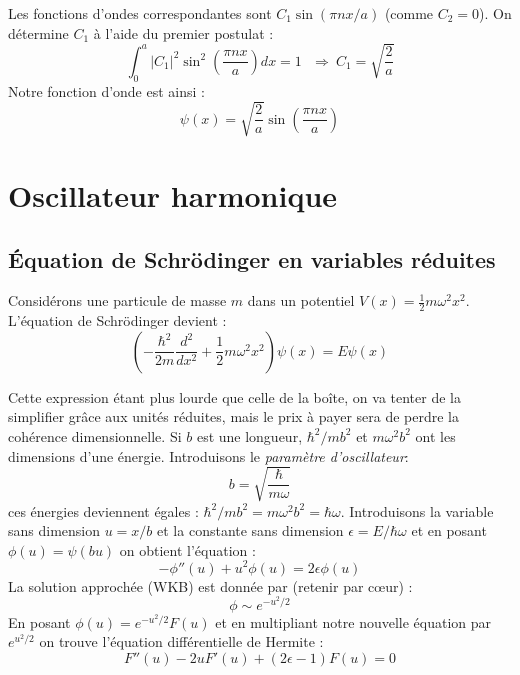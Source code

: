 \documentclass	[11pt, a4paper, openany]{book}
\begin{document}
	Les fonctions d'ondes correspondantes sont $C_1\sin(\pi n x/a)$ (comme $C_2 = 0$). On détermine $C_1$ à l'aide du premier postulat :
	\begin{equation}
		\int_0^a |C_1|^2\sin^2\left(\frac{\pi n x}{a}\right)dx = 1\ \ \ \Rightarrow\ C_1 = \sqrt{\frac{2}{a}}
	\end{equation}
	Notre fonction d'onde est ainsi :
	\begin{equation}
		\psi(x) = \sqrt{\frac{2}{a}}\sin\left(\frac{\pi n x}{a}\right)
	\end{equation}
	
	
	\section{Oscillateur harmonique}
	\subsection{Équation de Schrödinger en variables réduites}
	Considérons une particule de masse $m$ dans un potentiel $V(x) = \frac{1}{2}m\omega^2x^2$. L'équation de Schrödinger devient :
	\begin{equation}
		\left(-\frac{\hbar^2}{2m}\frac{d^2}{dx^2} + \frac{1}{2}m\omega^2x^2\right)\psi(x) = E\psi(x)
	\end{equation}
	
	Cette expression étant plus lourde que celle de la boîte, on va tenter de la simplifier grâce aux unités réduites, mais le prix à payer sera de perdre la cohérence dimensionnelle. Si $b$ est une longueur, $\hbar^2/mb^2$ et $m\omega^2b^2$ ont les dimensions d'une énergie.  Introduisons le \textit{paramètre d'oscillateur}:
	\begin{equation}
		b = \sqrt{\dfrac{\hbar}{m\omega}}
	\end{equation}
	ces énergies deviennent égales : $\hbar^2/mb^2 = m\omega^2b^2 = \hbar\omega$. Introduisons la variable sans dimension $u = x/b$ et la constante sans dimension $\epsilon = E/\hbar\omega$ et en posant $\phi(u) = \psi(bu)$ on obtient l'équation :
	\begin{equation}
		-\phi''(u) + u^2\phi(u) = 2\epsilon\phi(u)
	\end{equation}
	La solution approchée (WKB) est donnée par (retenir par cœur) :
	\begin{equation}
		\phi \sim e^{-u^2/2}
	\end{equation}
	En posant $\phi(u) = e^{-u^2/2}F(u)$ et en multipliant notre nouvelle équation par $e^{u^2/2}$ on trouve l'équation différentielle de Hermite :
	\begin{equation}
		F''(u) - 2uF'(u) + (2\epsilon - 1)F(u) = 0
	\end{equation}
	
\end{document}
